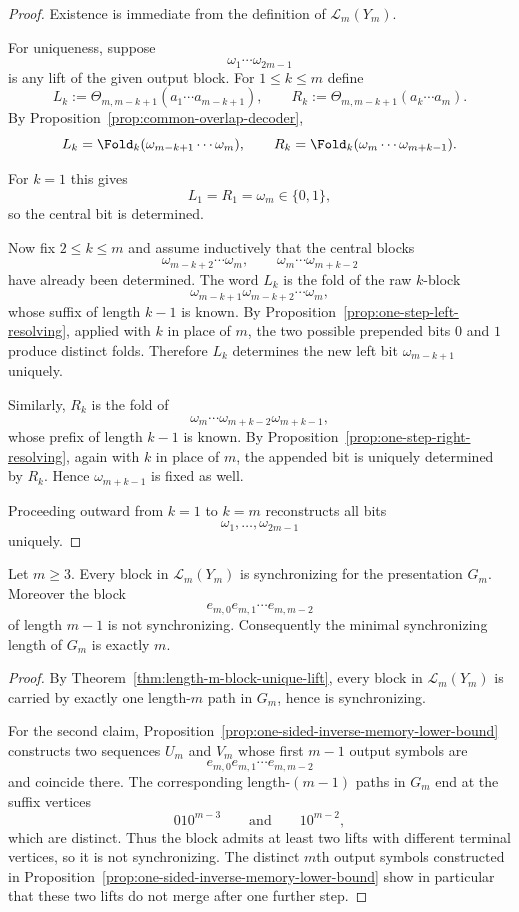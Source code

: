\begin{proof}
Existence is immediate from the definition of $\mathcal L_m(Y_m)$.

For uniqueness, suppose
\[
\omega_1\cdots\omega_{2m-1}
\]
is any lift of the given output block.  For $1\le k\le m$ define
\[
L_k:=\Theta_{m,m-k+1}(a_1\cdots a_{m-k+1}),
\qquad
R_k:=\Theta_{m,m-k+1}(a_k\cdots a_m).
\]
By Proposition~\ref{prop:common-overlap-decoder},
\[
L_k=\Fold_k(\omega_{m-k+1}\cdots\omega_m),
\qquad
R_k=\Fold_k(\omega_m\cdots\omega_{m+k-1}).
\]

For $k=1$ this gives
\[
L_1=R_1=\omega_m\in\{0,1\},
\]
so the central bit is determined.

Now fix $2\le k\le m$ and assume inductively that the central blocks
\[
\omega_{m-k+2}\cdots\omega_m,
\qquad
\omega_m\cdots\omega_{m+k-2}
\]
have already been determined.  The word $L_k$ is the fold of the raw $k$-block
\[
\omega_{m-k+1}\omega_{m-k+2}\cdots\omega_m,
\]
whose suffix of length $k-1$ is known.  By
Proposition~\ref{prop:one-step-left-resolving}, applied with $k$ in place of
$m$, the two possible prepended bits $0$ and $1$ produce distinct folds.
Therefore $L_k$ determines the new left bit $\omega_{m-k+1}$ uniquely.

Similarly, $R_k$ is the fold of
\[
\omega_m\cdots\omega_{m+k-2}\omega_{m+k-1},
\]
whose prefix of length $k-1$ is known.  By
Proposition~\ref{prop:one-step-right-resolving}, again with $k$ in place of
$m$, the appended bit is uniquely determined by $R_k$.  Hence $\omega_{m+k-1}$
is fixed as well.

Proceeding outward from $k=1$ to $k=m$ reconstructs all bits
\[
\omega_1,\ldots,\omega_{2m-1}
\]
uniquely.
\end{proof}

\begin{corollary}
\label{cor:uniform-synchronizing-length}
Let $m\ge 3$.  Every block in $\mathcal L_m(Y_m)$ is synchronizing for the
presentation $G_m$.  Moreover the block
\[
e_{m,0}e_{m,1}\cdots e_{m,m-2}
\]
of length $m-1$ is not synchronizing.  Consequently the minimal synchronizing
length of $G_m$ is exactly $m$.
\end{corollary}

\begin{proof}
By Theorem~\ref{thm:length-m-block-unique-lift}, every block in
$\mathcal L_m(Y_m)$ is carried by exactly one length-$m$ path in $G_m$, hence
is synchronizing.

For the second claim, Proposition~\ref{prop:one-sided-inverse-memory-lower-bound}
constructs two sequences $U_m$ and $V_m$ whose first $m-1$ output symbols are
\[
e_{m,0}e_{m,1}\cdots e_{m,m-2}
\]
and coincide there.  The corresponding length-$(m-1)$ paths in $G_m$ end at the
suffix vertices
\[
010^{m-3}
\qquad\text{and}\qquad
10^{m-2},
\]
which are distinct.  Thus the block admits at least two lifts with different
terminal vertices, so it is not synchronizing.  The distinct $m$th output
symbols constructed in Proposition~\ref{prop:one-sided-inverse-memory-lower-bound}
show in particular that these two lifts do not merge after one further step.
\end{proof}

